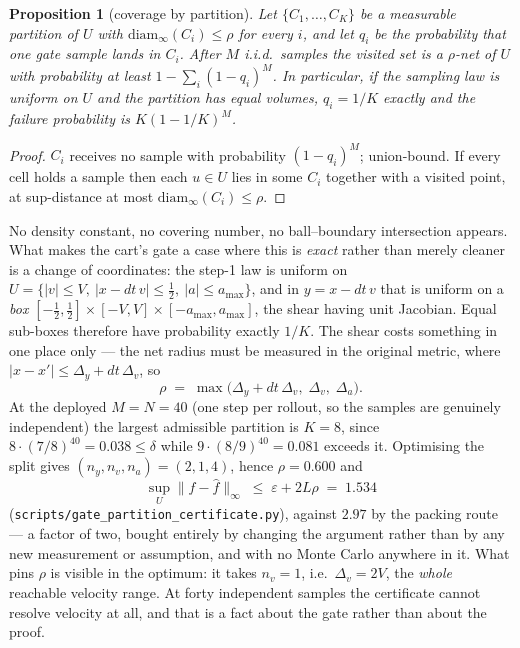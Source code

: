 \documentclass[11pt]{article}
\newtheorem{proposition}{Proposition}
\theoremstyle{definition}
\theoremstyle{remark}
\begin{document}
\begin{proposition}[coverage by partition]
\label{prop:partition}
Let $\{C_1, \dots, C_K\}$ be a measurable partition of $U$ with $\mathrm{diam}_\infty(C_i) \leq \rho$ for every $i$, and let $q_i$ be the probability that one gate sample lands in $C_i$. After $M$ i.i.d.\ samples the visited set is a $\rho$-net of $U$ with probability at least $1 - \sum_i (1-q_i)^M$. In particular, if the sampling law is uniform on $U$ and the partition has equal volumes, $q_i = 1/K$ exactly and the failure probability is $K(1-1/K)^M$.
\end{proposition}

\begin{proof}
$C_i$ receives no sample with probability $(1-q_i)^M$; union-bound. If every cell holds a sample then each $u \in U$ lies in some $C_i$ together with a visited point, at sup-distance at most $\mathrm{diam}_\infty(C_i) \leq \rho$.
\end{proof}

No density constant, no covering number, no ball--boundary intersection appears. What makes the cart's gate a case where this is \emph{exact} rather than merely cleaner is a change of coordinates: the step-1 law is uniform on $U = \{|v| \leq V,\ |x - dt\,v| \leq \tfrac12,\ |a| \leq a_{\max}\}$, and in $y = x - dt\,v$ that is uniform on a \emph{box} $[-\tfrac12,\tfrac12] \times [-V,V] \times [-a_{\max},a_{\max}]$, the shear having unit Jacobian. Equal sub-boxes therefore have probability exactly $1/K$. The shear costs something in one place only --- the net radius must be measured in the original metric, where $|x - x'| \leq \Delta_y + dt\,\Delta_v$, so
\[
  \rho \;=\; \max\big(\Delta_y + dt\,\Delta_v,\; \Delta_v,\; \Delta_a\big).
\]
At the deployed $M = N = 40$ (one step per rollout, so the samples are genuinely independent) the largest admissible partition is $K = 8$, since $8 \cdot (7/8)^{40} = 0.038 \leq \delta$ while $9 \cdot (8/9)^{40} = 0.081$ exceeds it. Optimising the split gives $(n_y, n_v, n_a) = (2,1,4)$, hence $\rho = 0.600$ and
\[
  \sup_U \|f - \hat f\|_\infty \;\leq\; \varepsilon + 2L\rho \;=\; \mathbf{1.534}
\]
(\texttt{scripts/\allowbreak gate\_\allowbreak partition\_\allowbreak certificate.py}), against $2.97$ by the packing route --- a factor of two, bought entirely by changing the argument rather than by any new measurement or assumption, and with no Monte Carlo anywhere in it. What pins $\rho$ is visible in the optimum: it takes $n_v = 1$, i.e.\ $\Delta_v = 2V$, the \emph{whole} reachable velocity range. At forty independent samples the certificate cannot resolve velocity at all, and that is a fact about the gate rather than about the proof.
\end{document}
